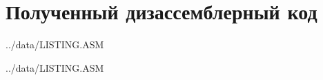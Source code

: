 \section*{Полученный дизассемблерный код}

\begin{lstinputlisting}[
	caption={Обработчик INT 8h},
	label={lst:int8h},
	linerange={1-84}
]{../data/LISTING.ASM}
\end{lstinputlisting}

\newpage
\begin{lstinputlisting}[
	caption={Подпрограмма sub\_1},
	label={lst:int8h},
	linerange={86-117}
]{../data/LISTING.ASM}
\end{lstinputlisting}
